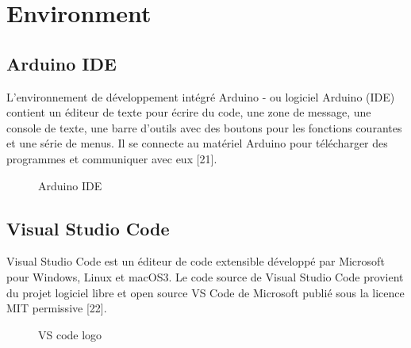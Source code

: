 \section{Environment}
\subsection{Arduino IDE}
L’environnement de développement intégré Arduino - ou logiciel Arduino (IDE) contient un éditeur de texte pour écrire du code, une zone de message, une console de texte, une barre d’outils avec des boutons pour les fonctions courantes et une série de menus. Il se connecte au matériel Arduino pour télécharger des programmes et communiquer avec eux [21].

\begin{figure}[hbt]
\centering
\right
\label{fig:Arduino IDE LOGO}
 \caption{Arduino IDE}

\end{figure}
\break
\newline
\subsection{Visual Studio Code}
Visual Studio Code est un éditeur de code extensible développé par Microsoft pour Windows, Linux et macOS3. Le code source de Visual Studio Code provient du projet logiciel libre et open source VS Code de Microsoft publié sous la licence MIT permissive [22].

\begin{figure}[hbt]
\centering
\right
\label{fig:VScode LOGO}

  \caption{VS code logo}
\end{figure}

